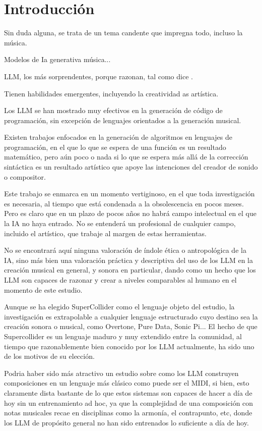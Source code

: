 \chapter{Introducción}

Sin duda alguna, se trata de un tema candente que impregna todo, incluso la música.

Modelos de Ia generativa música...

LLM, los más sorprendentes, porque razonan, tal como dice \cite{chenTeachingLargeLanguage2023}.

Tienen habilidades emergentes, incluyendo la creatividad as artística.

Los LLM se han mostrado muy efectivos en la generación de código de programación, sin excepción de lenguajes orientados a la generación musical. 

Existen trabajos enfocados en la generación de algoritmos en lenguajes de programación, en el que lo que se espera de una función es un resultado matemático, pero aún poco o nada si lo que se espera más allá de la corrección sintáctica es un resultado artístico que apoye las intenciones del creador de sonido o compositor.

Este trabajo se enmarca en un momento vertiginoso, en el que toda investigación es necesaria, al tiempo que está condenada a la obsolescencia en pocos meses. Pero es claro que en un plazo de pocos años no habrá campo intelectual en el que la IA no haya entrado. No se entenderá un profesional de cualquier campo, incluido el artístico, que trabaje al margen de estas herramientas.

No se encontrará aquí ninguna valoración de índole ética o antropológica de la IA, sino más bien una valoración práctica y descriptiva del uso de los LLM en la creación musical en general, y sonora en particular, dando como un hecho que los LLM son capaces de razonar y crear a niveles comparables al humano en el momento de este estudio.

Aunque se ha elegido SuperCollider como el lenguaje objeto del estudio, la investigación es extrapolable a cualquier lenguaje estructurado cuyo destino sea la creación sonora o musical, como Overtone, Pure Data, Sonic Pi... El hecho de que Supercollider es un lenguaje maduro y muy extendido entre la comunidad, al tiempo que razonablemente bien conocido por los LLM actualmente, ha sido uno de los motivos de su elección.

Podria haber sido más atractivo un estudio sobre como los LLM construyen composiciones en un lenguaje más clásico como puede ser el MIDI, si bien, esto claramente dista bastante de lo que estos sistemas son capaces de hacer a día de hoy sin un entrenamiento ad hoc, ya que la complejidad de una composición con notas musicales recae en disciplinas como la armonía, el contrapunto, etc, donde los LLM de propósito general no han sido entrenados lo suficiente a día de hoy.

